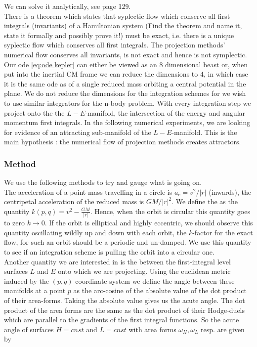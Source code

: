 \documentclass[12pt]{article}
\begin{document}
We can solve it analytically, see \cite{WBell} page 129. \\

There is a theorem which states that syplectic flow which conserve all first integrals (invariants) of a Hamiltonian system (Find the theorem and name it, state it formally and possibly prove it!) must be exact, i.e. there is a unique syplectic flow which conserves all first integrals. The projection methods' numerical flow conserves all invariants, is not exact and hence is not symplectic. \\


Our ode \eqref{eq:ode kepler} can either be viewed as an 8 dimensional beast or, when put into the inertial CM frame we can reduce the dimensions to 4, in which case it is the same ode as of a single reduced mass orbiting a central potential in the plane. We do not reduce the dimensions for the integration schemes for we wish to use similar integrators for the n-body problem. With every integration step we project onto the the $L-E$-manifold, the intersection of the energy and angular momentum first integrals. In the following numerical experiments, we are looking for evidence of an attracting sub-manifold of the $L-E$-manifold. This is the main hypothesis : the numerical flow of projection methods creates attractors.

\subsubsection{Method}

We use the following methods to try and gauge what is going on.\\

The acceleration of a point mass travelling in a circle is $a_c = v^2/|r|$ (inwards), the centripetal acceleration of the reduced mass is $GM/{|r|^2}$. We define the  as the quantity $k(p,q) = v^2 - \frac{GM}{|r|}$. Hence, when the orbit is circular this quantity goes to zero $k\to 0$. If the orbit is elliptical and highly eccentric, we should observe this quantity oscillating wildly up and down with each orbit, the $k$-factor for the exact flow, for such an orbit should be a periodic and un-damped. We use this quantity to see if an integration scheme is pulling the orbit into a circular one. \\

Another quantity we are interested in is the  between the first-integral level surfaces $L$ and $E$ onto which we are projecting. Using the euclidean metric induced by the $(p,q)$ coordinate system we define the angle between these manifolds at a point $p$ as the arc-cosine of the absolute value of the dot product of their area-forms. Taking the absolute value gives us the acute angle. The dot product of the area forms are the same as the dot product of their Hodge-duels which are parallel to the gradients of the first integral functions. So the acute angle of surfaces $H=cnst$ and $L=cnst$ with area forms $\omega_H,\omega_L$ resp. are given by 
\end{document}
